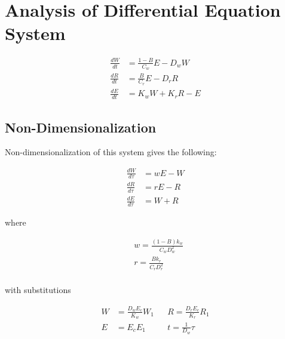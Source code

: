 \documentclass[12pt]{report}
\begin{document}

\section*{Analysis of Differential Equation System}

\begin{equation}
\begin{aligned}
\frac{dW}{dt}&=\frac{1-B}{C_w}E-D_w W\\
\frac{dR}{dt}&=\frac{B}{C_r}E-D_r R\\
\frac{dE}{dt}&=K_w W + K_r R - E
\end{aligned}
\label{eq: system}
\end{equation}




\subsection*{Non-Dimensionalization}

Non-dimensionalization of this system gives the following:

\begin{equation}
\begin{aligned}
\frac{dW}{d\tau}&=w E-W \\
\frac{dR}{d\tau}&=r E-R \\
\frac{dE}{d\tau}&=  W+R
\end{aligned}
\label{eq: nondim}
\end{equation}

where

\begin{equation}
\begin{aligned}
&w=\frac{(1-B) k_w}{C_w D_w^2}\\
&r=\frac{B k_r}{C_r D_r^2}\\
\end{aligned}
\label{eq: nondim wr}
\end{equation}

with substitutions

\begin{equation}
\begin{aligned}
W &= \frac{D_w E_{c}}{K_w}W_1
&&R = \frac{D_r E_{c}}{K_r}R_1\\
E &= E_c E_1  &&t = \frac{1}{D_w}\tau
\end{aligned}
\label{eq: subs}
\end{equation}
\end{document}
